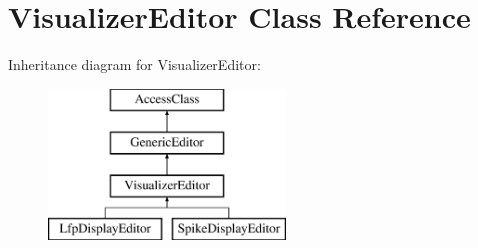 \hypertarget{classVisualizerEditor}{\section{Visualizer\-Editor Class Reference}
\label{classVisualizerEditor}
}
Inheritance diagram for Visualizer\-Editor\-:\begin{figure}[H]
\begin{center}
\leavevmode
\includegraphics[height=4.000000cm]{classVisualizerEditor}
\end{center}
\end{figure}
